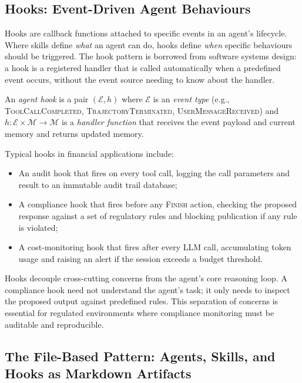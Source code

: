 \begin{deepdive}
\subsection{Hooks: Event-Driven Agent Behaviours}
\label{subsec:hooks}

Hooks are callback functions attached to specific events in an agent's lifecycle.
Where skills define \emph{what} an agent can do, hooks define \emph{when} specific
behaviours should be triggered. The hook pattern is borrowed from software systems
design: a hook is a registered handler that is called automatically when a predefined
event occurs, without the event source needing to know about the handler.

\begin{definition}
\label{def:agent-hook}
An \emph{agent hook} is a pair $(\mathcal{E}, h)$ where $\mathcal{E}$ is an
\emph{event type} (e.g., \textsc{ToolCallCompleted}, \textsc{TrajectoryTerminated},
\textsc{UserMessageReceived}) and $h: \mathcal{E} \times \mathcal{M} \to
\mathcal{M}$ is a \emph{handler function} that receives the event payload and
current memory and returns updated memory.
\end{definition}

Typical hooks in financial applications include:
\begin{itemize}
  \item An audit hook that fires on every tool call, logging the call parameters and
        result to an immutable audit trail database;
  \item A compliance hook that fires before any \textsc{Finish} action, checking the
        proposed response against a set of regulatory rules and blocking publication
        if any rule is violated;
  \item A cost-monitoring hook that fires after every LLM call, accumulating token
        usage and raising an alert if the session exceeds a budget threshold.
\end{itemize}

Hooks decouple cross-cutting concerns from the agent's core reasoning loop. A compliance
hook need not understand the agent's task; it only needs to inspect the proposed output
against predefined rules. This separation of concerns is essential for regulated
environments where compliance monitoring must be auditable and reproducible.


\subsection{The File-Based Pattern: Agents, Skills, and Hooks as Markdown Artifacts}
\label{subsec:file-based-pattern}


\end{deepdive}
